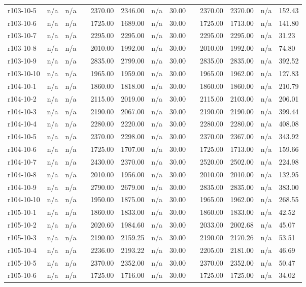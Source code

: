 \documentclass[final,5p,times,twocolumn]{elsarticle}
\begin{document}
{{{{{{{{{{{{{\begin{longtable}{l l l l l l l l l l l l l}
r103-10-5& n/a& n/a&&2370.00& 2346.00& n/a& 30.00&&2370.00& 2370.00& n/a& 152.43\\
r103-10-6& n/a& n/a&&1725.00& 1689.00& n/a& 30.00&&1725.00& 1713.00& n/a& 141.80\\
r103-10-7& n/a& n/a&&2295.00& 2295.00& n/a& 30.00&&2295.00& 2295.00& n/a& 31.23\\
r103-10-8& n/a& n/a&&2010.00& 1992.00& n/a& 30.00&&2010.00& 1992.00& n/a& 74.80\\
r103-10-9& n/a& n/a&&2835.00& 2799.00& n/a& 30.00&&2835.00& 2835.00& n/a& 392.52\\
r103-10-10& n/a& n/a&&1965.00& 1959.00& n/a& 30.00&&1965.00& 1962.00& n/a& 127.83\\
r104-10-1& n/a& n/a&&1860.00& 1818.00& n/a& 30.00&&1860.00& 1860.00& n/a& 210.79\\
r104-10-2& n/a& n/a&&2115.00& 2019.00& n/a& 30.00&&2115.00& 2103.00& n/a& 206.01\\
r104-10-3& n/a& n/a&&2190.00& 2067.00& n/a& 30.00&&2190.00& 2190.00& n/a& 399.44\\
r104-10-4& n/a& n/a&&2280.00& 2220.00& n/a& 30.00&&2280.00& 2280.00& n/a& 408.08\\
r104-10-5& n/a& n/a&&2370.00& 2298.00& n/a& 30.00&&2370.00& 2367.00& n/a& 343.92\\
r104-10-6& n/a& n/a&&1725.00& 1707.00& n/a& 30.00&&1725.00& 1713.00& n/a& 159.66\\
r104-10-7& n/a& n/a&&2430.00& 2370.00& n/a& 30.00&&2520.00& 2502.00& n/a& 224.98\\
r104-10-8& n/a& n/a&&2010.00& 1956.00& n/a& 30.00&&2010.00& 2010.00& n/a& 132.95\\
r104-10-9& n/a& n/a&&2790.00& 2679.00& n/a& 30.00&&2835.00& 2835.00& n/a& 383.00\\
r104-10-10& n/a& n/a&&1950.00& 1875.00& n/a& 30.00&&1965.00& 1962.00& n/a& 268.55\\
r105-10-1& n/a& n/a&&1860.00& 1833.00& n/a& 30.00&&1860.00& 1833.00& n/a& 42.52\\
r105-10-2& n/a& n/a&&2020.60& 1984.60& n/a& 30.00&&2033.00& 2002.68& n/a& 45.07\\
r105-10-3& n/a& n/a&&2190.00& 2159.25& n/a& 30.00&&2190.00& 2170.26& n/a& 53.51\\
r105-10-4& n/a& n/a&&2236.00& 2193.22& n/a& 30.00&&2205.00& 2181.00& n/a& 46.69\\
r105-10-5& n/a& n/a&&2370.00& 2352.00& n/a& 30.00&&2370.00& 2352.00& n/a& 50.47\\
r105-10-6& n/a& n/a&&1725.00& 1716.00& n/a& 30.00&&1725.00& 1725.00& n/a& 34.02\\

\end{longtable}}}}}}}}}}}}}}
\end{document}
